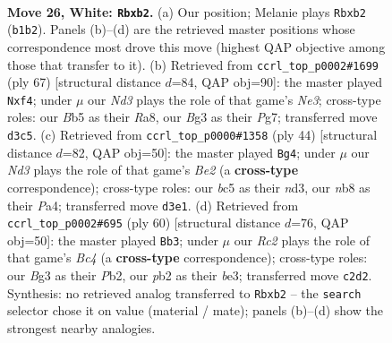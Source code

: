 \documentclass[11pt]{article}
\begin{document}
\clearpage

\begin{figure}[p]\centering
\begin{subfigure}{0.46\textwidth}\centering
\resizebox{\linewidth}{!}{%
\newchessgame
\chessboard[
  setfen={rnb3k1/8/1p2p3/1Bb2p1p/4r3/3N2BP/PpR2PK1/1R6 w - - 0 26},
  showmover=false,
  pgfstyle=straightmove, color=movearrow, markmove={b1-b2}
]}
\caption{}
\end{subfigure}\hfill
\begin{subfigure}{0.46\textwidth}\centering
\resizebox{\linewidth}{!}{%
\newchessgame
\chessboard[
  setfen={r7/6pk/2N1nb1p/3r1p1P/3P1B2/1R6/PP6/1K3R2 b - - 12 34},
  showmover=false,
  pgfstyle=straightmove, color=movearrow, markmove={e6-f4}
]}
\caption{}
\end{subfigure}
\\[4pt]
\begin{subfigure}{0.46\textwidth}\centering
\resizebox{\linewidth}{!}{%
\newchessgame
\chessboard[
  setfen={1k2r3/p4pr1/1p1Rb3/1Np4P/P1p1P3/3nK2P/1P2B3/7R w - - 1 23},
  showmover=false,
  pgfstyle=straightmove, color=movearrow, markmove={e2-g4}
]}
\caption{}
\end{subfigure}\hfill
\begin{subfigure}{0.46\textwidth}\centering
\resizebox{\linewidth}{!}{%
\newchessgame
\chessboard[
  setfen={2r1k3/5pp1/pr6/4P3/RnBp1p2/4bN1P/1PP3P1/1K1R4 w - - 3 31},
  showmover=false,
  pgfstyle=straightmove, color=movearrow, markmove={c4-b3}
]}
\caption{}
\end{subfigure}
\caption{\textbf{Move 26, White: \texttt{Rbxb2}.} (a) Our position; Melanie plays \texttt{Rbxb2} (\texttt{b1b2}). Panels (b)--(d) are the retrieved master positions whose correspondence most drove this move (highest QAP objective among those that transfer to it). (b) Retrieved from \texttt{ccrl\_top\_p0002\#1699} (ply 67) [structural distance $d$=84, QAP obj=90]: the master played \texttt{Nxf4}; under $\mu$ our \emph{Nd3} plays the role of that game's \emph{Ne3}; cross-type roles: our \emph{B}b5 as their \emph{R}a8, our \emph{B}g3 as their \emph{P}g7; transferred move \texttt{d3c5}. (c) Retrieved from \texttt{ccrl\_top\_p0000\#1358} (ply 44) [structural distance $d$=82, QAP obj=50]: the master played \texttt{Bg4}; under $\mu$ our \emph{Nd3} plays the role of that game's \emph{Be2} (a \textbf{cross-type} correspondence); cross-type roles: our \emph{b}c5 as their \emph{n}d3, our \emph{n}b8 as their \emph{P}a4; transferred move \texttt{d3e1}. (d) Retrieved from \texttt{ccrl\_top\_p0002\#695} (ply 60) [structural distance $d$=76, QAP obj=50]: the master played \texttt{Bb3}; under $\mu$ our \emph{Rc2} plays the role of that game's \emph{Bc4} (a \textbf{cross-type} correspondence); cross-type roles: our \emph{B}g3 as their \emph{P}b2, our \emph{p}b2 as their \emph{b}e3; transferred move \texttt{c2d2}. Synthesis: no retrieved analog transferred to \texttt{Rbxb2} -- the \texttt{search} selector chose it on value (material / mate); panels (b)--(d) show the strongest nearby analogies.}
\label{fig:thought-m50}
\end{figure}
\end{document}
